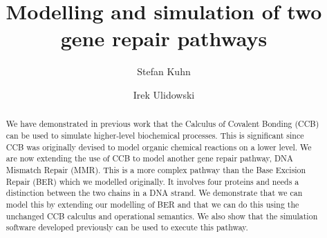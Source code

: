 \documentclass[review]{elsarticle}
\begin{document}
\begin{frontmatter}

\title{Modelling and simulation of two gene repair pathways}

\author{Stefan Kuhn}%
\address{School of Computer Science and Informatics, De Montfort University, Leicester, UK}

\author{Irek Ulidowski}%
\address{School of Informatics, University of Leicester, Leicester, UK}


%

\begin{abstract}
We have demonstrated in previous work that the Calculus of Covalent Bonding (CCB) can be used to simulate higher-level biochemical processes. This is significant since CCB was originally devised to model organic chemical reactions on a lower level. We are now extending the use of CCB to model another gene repair pathway, DNA Mismatch Repair (MMR). This is a more complex pathway than the Base Excision Repair (BER) which we modelled originally. It involves four proteins and needs a distinction between the two chains in a DNA strand. We demonstrate that we can model this by extending our modelling of BER and that we can do this using the unchanged CCB calculus and operational semantics. We also show that the simulation software developed previously can be used to execute this pathway.
\end{abstract}

\begin{keyword}
\end{keyword}

\end{frontmatter}
\end{document}
